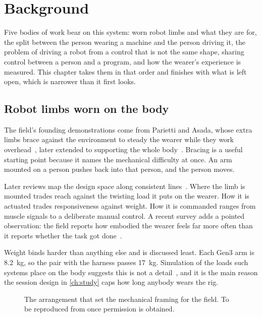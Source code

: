 \chapter{Background}
\label{ch:background}

Five bodies of work bear on this system: worn robot limbs and what they are
for, the split between the person wearing a machine and the person driving it,
the problem of driving a robot from a control that is not the same shape,
sharing control between a person and a program, and how the wearer's
experience is measured. This chapter takes them in that order and finishes
with what is left open, which is narrower than it first looks.

\section{Robot limbs worn on the body}

The field's founding demonstrations come from Parietti and Asada, whose extra
limbs brace against the environment to steady the wearer while they work
overhead~\cite{parietti2014bracing,parietti2013dynamic}, later extended to
supporting the whole body~\cite{parietti2016support}. Bracing is a useful
starting point because it names the mechanical difficulty at once. An arm
mounted on a person pushes back into that person, and the person moves.

Later reviews map the design space along consistent
lines~\cite{yang2021srlreview,prattichizzo2021augmentation,tong2021srlreview,zhang2023srlreview}.
Where the limb is mounted trades reach against the twisting load it puts on
the wearer. How it is actuated trades responsiveness against weight. How it is
commanded ranges from muscle signals to a deliberate manual control. A recent
survey adds a pointed observation: the field reports how embodied the wearer
feels far more often than it reports whether the task got
done~\cite{zheng2026quantitative}.

Weight binds harder than anything else and is discussed least. Each Gen3 arm
is \SI{8.2}{\kilo\gram}, so the pair with the harness passes
\SI{17}{\kilo\gram}. Simulation of the loads such systems place on the body
suggests this is not a detail~\cite{moon2024impact}, and it is the main reason
the session design in \cref{ch:study} caps how long anybody wears the rig.

\begin{figure}[htbp]
  \centering
  \caption[Bracing limbs (to be reproduced)]{The arrangement that set the
  mechanical framing for the field. To be reproduced from
  \cite{parietti2014bracing} once permission is obtained.}
  \label{fig:repro-bracing}
\end{figure}

